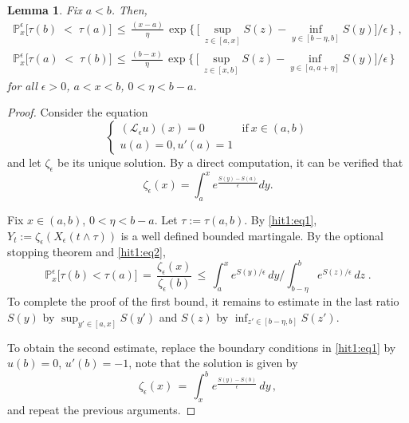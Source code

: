 \documentclass[reqno]{amsart}
\theoremstyle{plain}
\newtheorem{lemma}[theorem]{Lemma}
\theoremstyle{definition}
\newcommand{\bb}[1]{{\mathbb #1}}
\newcommand{\ms}[1]{{\mathscr #1}}
\newcounter{as}[section]
\newcommand{\<}{\langle}
\renewcommand{\>}{\rangle}
\begin{document}
\begin{lemma}
\label{l02}
Fix $a < b $. 
Then, 
\begin{equation*}
\begin{gathered}
\bb P^{\epsilon}_{x}\big[\tau(b)\;<\; \tau(a)\big] \,\leq\,
\frac{(x-a)}{\eta}   \,
\exp\Big\{ \,\big[ \, \sup_{z\in [a,x] } S(z) - \inf_{y\in [b-\eta, b]} S(y)
\big]/\epsilon \,\Big\} \;,
\\
\bb P^{\epsilon}_{x}\big[\tau(a)\;<\;
\tau(b)\big] \,\leq\,
\frac{(b-x)}{\eta}   \,
\exp\Big\{ \,\big[ \, \sup_{z\in [x,b] } S(z) - \inf_{y\in [a,a+\eta]} S(y)
\big]/\epsilon \,\Big\} 
\end{gathered}
\end{equation*}
for all $\epsilon > 0$, $a<x<b$, $0<\eta< b-a$.
\end{lemma}

\begin{proof}
Consider the
equation
\begin{equation}
\label{hit1:eq1}
\begin{cases}
(\ms L_{\epsilon}u)(x) = 0 &\text{if}\ x\in (a,b) \\ u(a) =
0, u'(a) = 1
\end{cases}
\end{equation}
and let $\zeta_{\epsilon}$ be its unique solution. By a direct
computation, it can be verified that
\begin{equation}
\label{hit1:eq2}
\zeta_{\epsilon}(x) = \int_{a}^{x}e^{\frac{S(y)-S(a)}{\epsilon}}dy.
\end{equation}

Fix $x \in (a,b)$, $0<\eta<b-a$.  Let $\tau := \tau(a,b)$. By
\eqref{hit1:eq1},
$Y_{t} := \zeta_{\epsilon}(X_{\epsilon} (t\wedge \tau))$ is a well
defined bounded martingale. By the optional stopping theorem and
\eqref{hit1:eq2},
\begin{equation}
\label{63}
\bb P^\epsilon_{x}\big[\tau(b)< \tau(a)\big] \,=\,
\frac{\zeta_{\epsilon}(x)}{\zeta_{\epsilon}(b)} \,\le\,
\int_{a}^{x}e^{S(y)/ \epsilon}\, dy \Big/
\int_{b-\eta}^{b}e^{S(z)/ \epsilon}\, dz\;.
\end{equation}
To complete the proof of the first bound, it remains to estimate in
the last ratio $S(y)$ by $\sup_{y'\in [a,x]} S(y')$ and $S(z)$ by
$\inf_{z'\in [b-\eta,b]} S(z')$.

To obtain the second estimate, replace the boundary conditions in
\eqref{hit1:eq1} by $u(b)=0$, $u'(b)=-1$, note that the solution is
given by
\begin{equation*}
\zeta_{\epsilon}(x) \,=\, 
\int_{x}^{b} e^{\frac{S(y)-S(b)}{\epsilon}}\, dy\, ,
\end{equation*}
and repeat the previous arguments.
\end{proof}
\end{document}
